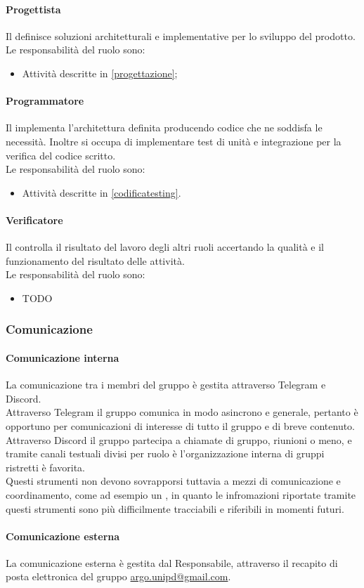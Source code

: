 \paragraph{Progettista}
Il \Progettista{} definisce soluzioni architetturali e implementative per lo sviluppo del prodotto.\\
Le responsabilità del ruolo sono:
\begin{itemize}
  \item Attività descritte in \ref{progettazione};
\end{itemize}

\paragraph{Programmatore}
Il \Programmatore{} implementa l'architettura definita producendo codice che ne soddisfa le necessità. Inoltre si occupa di implementare test di unità e integrazione per la verifica del codice scritto.\\
Le responsabilità del ruolo sono:
\begin{itemize}
  \item Attività descritte in \ref{codificatesting}.
\end{itemize}

\paragraph{Verificatore}
Il \Verificatore{} controlla il risultato del lavoro degli altri ruoli accertando la qualità e il funzionamento del risultato delle attività.\\
Le responsabilità del ruolo sono:
\begin{itemize}
  \item TODO
\end{itemize}

\subsubsection{Comunicazione}
\paragraph{Comunicazione interna}
La comunicazione tra i membri del gruppo è gestita attraverso Telegram e Discord.\\
Attraverso Telegram il gruppo comunica in modo asincrono e generale, pertanto è opportuno per comunicazioni di interesse di tutto il gruppo e di breve contenuto.\\
Attraverso Discord il gruppo partecipa a chiamate di gruppo, riunioni o meno, e tramite canali testuali divisi per ruolo è l'organizzazione interna di gruppi ristretti è favorita.\\
Questi strumenti non devono sovrapporsi tuttavia a mezzi di comunicazione e coordinamento, come ad esempio un , in quanto le infromazioni riportate tramite questi strumenti sono più difficilmente tracciabili e riferibili in momenti futuri.

\paragraph{Comunicazione esterna}
La comunicazione esterna è gestita dal Responsabile, attraverso il recapito di posta elettronica del gruppo \href{mailto:argo.unipd@gmail.com}{argo.unipd\-@\-gmail.com}.